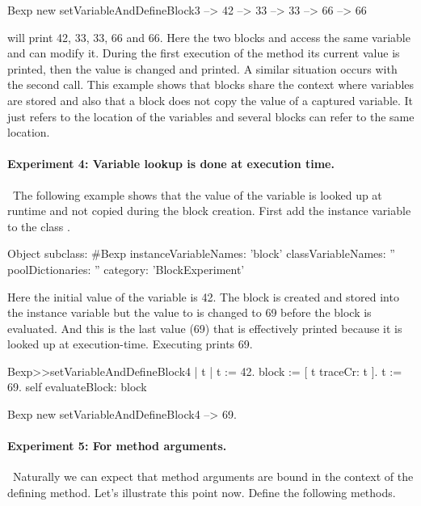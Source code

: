 \documentclass[a4paper,10pt,twoside]{book}
\begin{document}
\begin{code}{}
Bexp new setVariableAndDefineBlock3
	--> 42
	--> 33
	--> 33
	--> 66 
	--> 66
\end{code}

 will print 42, 33, 33, 66 and 66.
Here the two blocks \ct{[ t := 33. t traceCr ]} and \ct{[ t := 66. t traceCr ]} access the same variable  and can modify it. During the first execution of the method  its current value  is printed, then the value is changed and printed. A similar situation occurs with the second call. This example shows that blocks share the context where variables are stored and also that a block does not copy the value of a captured variable. It just refers to the location of the variables and several blocks can refer to the same location.

\paragraph{Experiment 4: Variable lookup is done at execution time.}\
The following example shows that the value of the variable is looked up at runtime and not copied during the block creation. First add the instance variable  to the class .

\begin{code}{}
Object subclass: #Bexp
	instanceVariableNames: 'block'
	classVariableNames: ''
	poolDictionaries: ''
	category: 'BlockExperiment'
\end{code}

Here the initial value of the variable  is 42. The block is created and stored into the instance variable  but the value to  is changed to 69 before the block is evaluated. And this is the last value (69) that is effectively printed because it is looked up at execution-time. Executing  prints 69.



\begin{code}{}
Bexp>>setVariableAndDefineBlock4
	| t |
	t := 42.
	block := [ t traceCr: t ].
	t := 69.
	self evaluateBlock: block

Bexp new setVariableAndDefineBlock4 
	--> 69.
\end{code}

\paragraph{Experiment 5: For method arguments.}\
Naturally we can expect that method arguments are bound in the context of the defining method. Let's illustrate this point now. Define the following methods.
\end{document}
